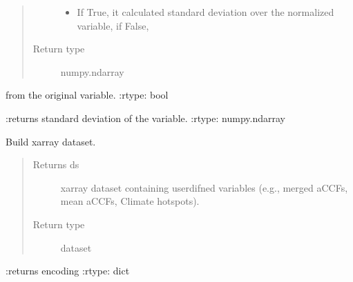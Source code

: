 \documentclass[a4paper,11pt,english]{sphinxmanual}
\begin{document}
\begin{fulllineitems}
\begin{fulllineitems}
\begin{quote}
\begin{description}
\begin{itemize}
\item {} 
 \textendash{} If True, it calculated standard deviation over the normalized variable, if False,

\end{itemize}

\item[{Return type}] \leavevmode
numpy.ndarray

\end{description}\end{quote}

from the original variable.
:rtype: bool

:returns standard deviation of the variable.
:rtype: numpy.ndarray

\end{fulllineitems}


\begin{fulllineitems}
\label{\detokenize{envlib:envlib.accf.CalAccf.get_xarray}}
Build xarray dataset.
\begin{quote}\begin{description}
\item[{Returns ds}] \leavevmode
xarray dataset containing user\sphinxhyphen{}difned variables (e.g., merged aCCFs, mean aCCFs, Climate hotspots).

\item[{Return type}] \leavevmode
dataset

\end{description}\end{quote}

:returns encoding
:rtype: dict

\end{fulllineitems}


\end{fulllineitems}


\begin{fulllineitems}
\label{\detokenize{envlib:envlib.accf.convert_accf}}
\end{fulllineitems}
\end{document}
